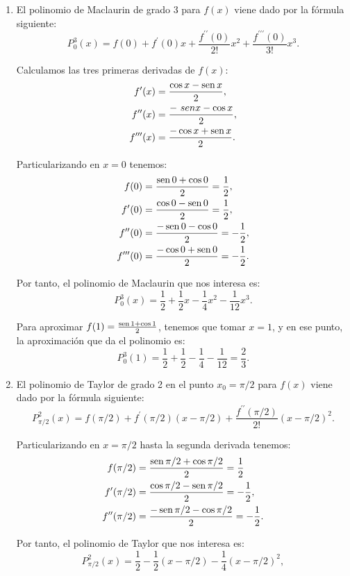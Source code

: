 {\begin{enumerate}
\item  El polinomio de Maclaurin de grado 3 para $f(x)$ viene dado por la fórmula siguiente:
\[
P_0^3(x)=f(0)+f^{\prime }(0)x+\frac{f^{\prime \prime }(0)}{2!}x^2+\frac{f^{\prime \prime \prime }(0)}{3!}x^3.
\]

Calculamos las tres primeras derivadas de $f(x)$:
\begin{align*}
f^{\prime }(x) &= \frac{\cos x-\operatorname{sen} x}{2}, \\
f^{\prime \prime }(x) &= \frac{-\ sen x-\cos x}{2}, \\
f^{\prime \prime \prime }(x) &= \frac{-\cos x+\operatorname{sen} x}{2}.
\end{align*}

Particularizando en $x=0$ tenemos:
\begin{align*}
f(0) &= \frac{\operatorname{sen} 0+\cos 0}2=\frac{1}{2}, \\
f^{\prime }(0) &= \frac{\cos 0-\operatorname{sen} 0}{2}=\frac{1}{2}, \\
f^{\prime \prime }(0) &= \frac{-\operatorname{sen} 0-\cos 0}{2}=-\frac{1}{2}, \\
f^{\prime \prime \prime }(0) &= \frac{-\cos 0+\operatorname{sen} 0}{2}=-\frac{1}{2}.
\end{align*}

Por tanto, el polinomio de Maclaurin que nos interesa es:
\[
P_0^3(x)=\frac{1}{2}+\frac{1}{2}x-\frac{1}{4}x^2-\frac{1}{12}x^3.
\]

Para aproximar $f(1)=\frac{\operatorname{sen} 1+\cos 1}{2}$, tenemos que tomar $x=1$, y en ese punto, la aproximación que da el polinomio es:
\[
P_0^3(1)=\frac{1}{2}+\frac{1}{2}-\frac{1}{4}-\frac{1}{12}=\frac{2}{3}.
\]

\item  El polinomio de Taylor de grado 2 en el punto $x_0=\pi/2$ para $f(x)$ viene dado por la fórmula siguiente:
\[
P_{\pi /2}^2(x)=f(\pi /2)+f^{\prime }(\pi /2)(x-\pi /2)+\frac{f^{\prime\prime }(\pi /2)}{2!}(x-\pi /2)^2.
\]

Particularizando en $x=\pi/2$ hasta la segunda derivada tenemos:
\begin{align*}
f(\pi /2) &= \frac{\operatorname{sen}\pi/2+\cos \pi /2}{2} = \frac{1}{2} \\
f^{\prime }(\pi/2) &= \frac{\cos \pi /2-\operatorname{sen}\pi/2}{2} = -\frac{1}{2}, \\
f^{\prime \prime}(\pi/2) &= \frac{-\operatorname{sen}\pi/2-\cos\pi/2}{2} = -\frac{1}{2}.
\end{align*}

Por tanto, el polinomio de Taylor que nos interesa es:
\[
P_{\pi/2}^2(x)=\frac{1}{2}-\frac{1}{2}(x-\pi/2)-\frac{1}{4}(x-\pi/2)^2,
\]


\end{enumerate}}
